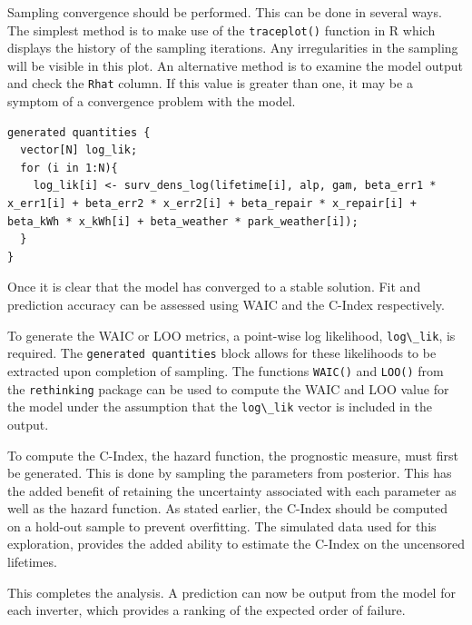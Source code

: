 Sampling convergence should be performed. This can be done in several ways. The simplest method is to make use of the \lstinline{traceplot()} function in R which displays the history of the sampling iterations. Any irregularities in the sampling will be visible in this plot. An alternative method is to examine the model output and check the \lstinline{Rhat} column. If this value is greater than one, it may be a symptom of a convergence problem with the model.

\begin{lstlisting}
generated quantities {
  vector[N] log_lik;
  for (i in 1:N){
  	log_lik[i] <- surv_dens_log(lifetime[i], alp, gam, beta_err1 * x_err1[i] + beta_err2 * x_err2[i] + beta_repair * x_repair[i] + beta_kWh * x_kWh[i] + beta_weather * park_weather[i]);
  }
}
\end{lstlisting}

Once it is clear that the model has converged to a stable solution. Fit and prediction accuracy can be assessed using WAIC and the C-Index respectively. 

To generate the WAIC or LOO metrics, a point-wise log likelihood, \lstinline{log\_lik}, is required. The \lstinline{generated quantities} block allows for these likelihoods to be extracted upon completion of sampling. The functions \lstinline{WAIC()} and \lstinline{LOO()} from the \lstinline{rethinking} package can be used to compute the WAIC and LOO value for the model under the assumption that the \lstinline{log\_lik} vector is included in the output. 

To compute the C-Index, the hazard function, the prognostic measure, must first be generated. This is done by sampling the parameters from posterior. This has the added benefit of retaining the uncertainty associated with each parameter as well as the hazard function. As stated earlier, the C-Index should be computed on a hold-out sample to prevent overfitting. The simulated data used for this exploration, provides the added ability to estimate the C-Index on the uncensored lifetimes. 

This completes the analysis. A prediction can now be output from the model for each inverter, which provides a ranking of the expected order of failure. 


